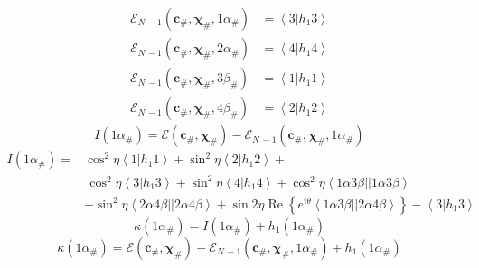 \documentclass[aps,preprint]{revtex4}%
\begin{document}
\begin{align*}
\mathcal{E}_{N\,-1}\left(  \mathbf{c}_{\#},\mathbf{\chi}_{\#}\mathbf{,}%
1\alpha_{\#}\right)   &  =\left\langle 3\left\vert h_{1}3\right.
\right\rangle \\
\mathcal{E}_{N\,-1}\left(  \mathbf{c}_{\#},\mathbf{\chi}_{\#}\mathbf{,}%
2\alpha_{\#}\right)   &  =\left\langle 4\left\vert h_{1}4\right.
\right\rangle \\
\mathcal{E}_{N\,-1}\left(  \mathbf{c}_{\#},\mathbf{\chi}_{\#}\mathbf{,}%
3\beta_{\#}\right)   &  =\left\langle 1\left\vert h_{1}1\right.  \right\rangle
\\
\mathcal{E}_{N\,-1}\left(  \mathbf{c}_{\#},\mathbf{\chi}_{\#}\mathbf{,}%
4\beta_{\#}\right)   &  =\left\langle 2\left\vert h_{1}2\right.
\right\rangle
\end{align*}%
\[
I\left(  1\alpha_{\#}\right)  =\mathcal{E}\left(  \mathbf{c}_{\#}%
,\mathbf{\chi}_{\#}\right)  -\mathcal{E}_{N\,-1}\left(  \mathbf{c}%
_{\#},\mathbf{\chi}_{\#}\mathbf{,}1\alpha_{\#}\right)
\]%
\begin{align*}
I\left(  1\alpha_{\#}\right)  = &  \cos^{2}\eta\left\langle 1\left\vert
h_{1}1\right.  \right\rangle +\sin^{2}\eta\left\langle 2\left\vert
h_{1}2\right.  \right\rangle +\\
&  \,\cos^{2}\eta\left\langle 3\left\vert h_{1}3\right.  \right\rangle
+\sin^{2}\eta\left\langle 4\left\vert h_{1}4\right.  \right\rangle +\cos
^{2}\eta\left\langle 1\alpha3\beta\right\vert \left\vert 1\alpha
3\beta\right\rangle \\
&  +\sin^{2}\eta\left\langle 2\alpha4\beta\right\vert \left\vert 2\alpha
4\beta\right\rangle +\sin2\eta\operatorname{Re}\left\{  e^{i\theta
}\left\langle 1\alpha3\beta\right\vert \left\vert 2\alpha4\beta\right\rangle
\right\}  -\left\langle 3\left\vert h_{1}3\right.  \right\rangle
\end{align*}%
\[
\kappa\left(  1\alpha_{\#}\right)  =I\left(  1\alpha_{\#}\right)
+h_{1}\left(  1\alpha_{\#}\right)
\]%
\[
\kappa\left(  1\alpha_{\#}\right)  =\mathcal{E}\left(  \mathbf{c}%
_{\#},\mathbf{\chi}_{\#}\right)  -\mathcal{E}_{N\,-1}\left(  \mathbf{c}%
_{\#},\mathbf{\chi}_{\#}\mathbf{,}1\alpha_{\#}\right)  +h_{1}\left(
1\alpha_{\#}\right)
\]%
\end{document}
